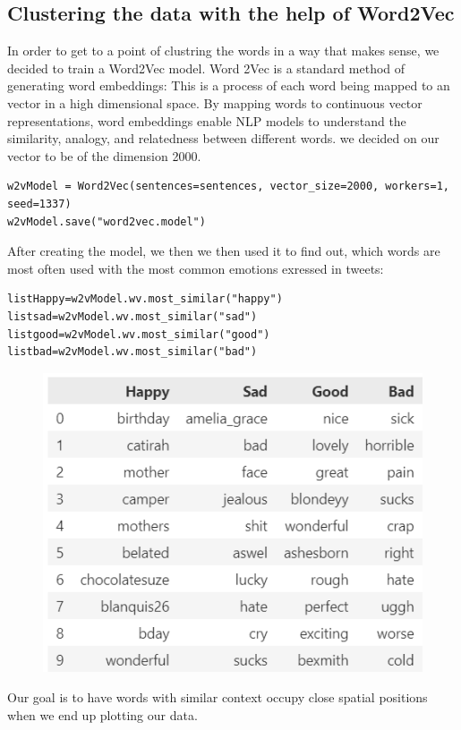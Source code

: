 \documentclass[11pt,a4paper]{article}
\begin{document}
\subsection{Clustering the data with the help of Word2Vec}
In order to get to a point of clustring the words in a way that makes sense, we decided to train a Word2Vec model. Word 2Vec is a standard method of generating word embeddings: This is a process of each word being mapped to an vector in a high dimensional space. By mapping words to continuous vector representations, word embeddings enable NLP models to understand the similarity, analogy, and relatedness between different words. we decided on our vector to be of the dimension 2000.  
\begin{lstlisting}
w2vModel = Word2Vec(sentences=sentences, vector_size=2000, workers=1, seed=1337)
w2vModel.save("word2vec.model")
\end{lstlisting}
After creating the model, we then we then used it to find out, which words are most often used with the most common emotions exressed in tweets:
\begin{lstlisting}
listHappy=w2vModel.wv.most_similar("happy")
listsad=w2vModel.wv.most_similar("sad")
listgood=w2vModel.wv.most_similar("good")
listbad=w2vModel.wv.most_similar("bad")
\end{lstlisting}
\begin{figure}[h]
\includegraphics[scale=0.6]{emotionwords}
\centering
\end{figure}
Our goal is to have words with similar context occupy close spatial positions when we end up plotting our data. 
\end{document}
